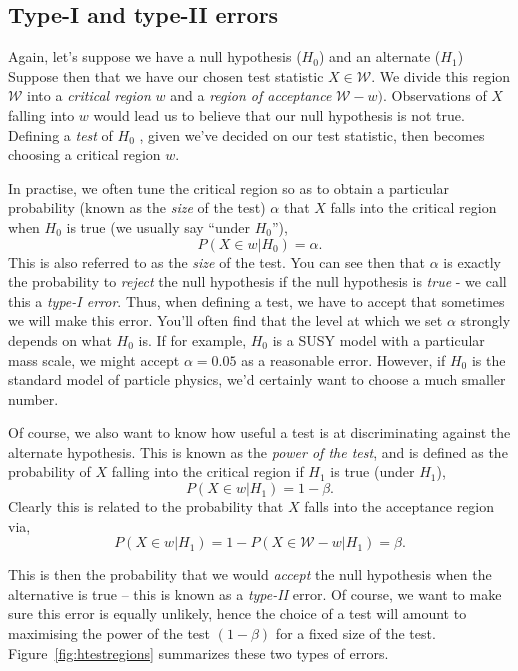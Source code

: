  \subsection{Type-I and type-II errors}
 Again, let's suppose we have a null hypothesis ($H_{0}$) and an alternate ($H_{1}$) Suppose then that we have our chosen test statistic $X\in \mathcal{W}$. We divide this region $\mathcal{W}$ into a \emph{critical region} ${w}$ and a \emph{region of acceptance} $\mathcal{W}-{w})$. Observations of $X$ falling into $w$ would lead us to believe that our null hypothesis is not true. Defining a \emph{test} of $H_{0}$ , given we've decided on our test statistic, then becomes choosing a critical region $w$. 
 
In practise, we often tune the critical region so as to obtain a particular probability (known as the \emph{size} of the test) $\alpha$ that $X$ falls into the critical region when $H_0$ is true (we usually say ``under $H_0$''), 
\begin{equation}\label{eqn:testsize}
     P(X\in w|H_{0})=\alpha.
\end{equation}
This is also referred to as the \emph{size} of the test. 
You can see then that $\alpha$ is exactly the probability to \emph{reject} the null hypothesis if the null hypothesis is \emph{true} - we call this a \emph{type-I error}. Thus, when defining a test, we have to accept that sometimes we will make this error. You'll often find that the level at which we set $\alpha$ strongly depends on what $H_0$ is. If for example, $H_0$ is a SUSY model with a particular mass scale, we might accept $\alpha=0.05$ as a reasonable error. However, if $H_0$ is the standard model of particle physics, we'd certainly want to choose a much smaller number. 

Of course, we also want to know how useful a test is at discriminating against the alternate hypothesis. This is known as the \emph{power of the test}, and is defined as the probability of $X$ falling into the critical region if $H_1$ is true (under $H_1$), 
\begin{equation}\label{eqn:power}
     P(X\in w|H_{1})=1-\beta.
\end{equation}
Clearly this is related to the probability that $X$ falls into the acceptance region via,
\begin{equation}
 P(X\in w|H_{1})=1-P(X\in \mathcal{W}-w|H_{1})=\beta.
\end{equation}

This is then the probability that we would \emph{accept} the null 
hypothesis when the alternative is true -- this is known as a 
\emph{type-II} error. Of course, we want to make sure this 
error is equally unlikely, hence the choice of a test will amount 
to maximising the power of the test $(1-\beta)$ for a fixed 
size of the test.  Figure~\ref{fig:htestregions} summarizes 
these two types of errors.

